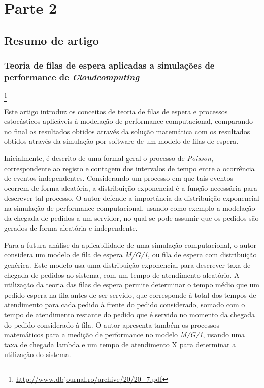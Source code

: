 \chapter{Parte 2}
\label{cap:p2}

\section{Resumo de artigo}

\subsection{Teoria de filas de espera aplicadas a simulações de performance de
	\emph{Cloudcomputing}}\footnote{\url{http://www.dbjournal.ro/archive/20/20_7.pdf}}



Este artigo introduz os conceitos de teoria de filas de espera e processos
estocásticos aplicáveis à modelação de performance computacional, comparando no
final os resultados obtidos através da solução matemática com os resultados
obtidos através da simulação por software de um modelo de filas de espera.
   
Inicialmente, é descrito de uma formal geral o processo de \emph{Poisson},
correspondente ao registo e contagem dos intervalos de tempo entre a ocorrência
de eventos independentes. Considerando um processo em que tais eventos ocorrem
de forma aleatória, a distribuição exponencial é a função necessária para
descrever tal processo. O autor defende a importância da distribuição
exponencial na simulação de performance computacional, usando como exemplo
a modelação da chegada de pedidos a um servidor, no qual se pode assumir que os
pedidos são gerados de forma aleatória e independente.

Para a futura análise da aplicabilidade de uma simulação computacional, o autor
considera um modelo de fila de espera \emph{M/G/1}, ou fila de espera com distribuição
genérica. Este modelo usa uma distribuição exponencial para descrever taxa de
chegada de pedidos ao sistema, com um tempo de atendimento aleatório.
A utilização da teoria das filas de espera permite determinar o tempo médio que
um pedido espera na fila antes de ser servido, que corresponde à total dos
tempos de atendimento para cada pedido à frente do pedido considerado, somado
com o tempo de atendimento restante do pedido que é servido no momento da
chegada do pedido considerado à fila. O autor apresenta também os processos
matemáticos para a medição de performance no modelo \emph{M/G/1}, usando uma taxa de
chegada lambda e um tempo de atendimento X para determinar a utilização do
sistema. 

